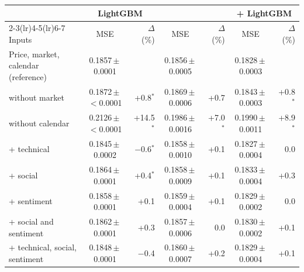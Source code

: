 \begin{tabular}{@{}lcrcrcr@{}}
\toprule
 & \multicolumn{2}{c}{LightGBM} & \multicolumn{2}{c}{\HQ{}} & \multicolumn{2}{c}{\HQ{} + LightGBM} \\
\cmidrule(lr){2-3}\cmidrule(lr){4-5}\cmidrule(lr){6-7}
Inputs & MSE & $\Delta$ (\%) & MSE & $\Delta$ (\%) & MSE & $\Delta$ (\%) \\
\midrule
Price, market, calendar (reference) & 0.1857\,$\pm$\,0.0001 &  & 0.1856\,$\pm$\,0.0005 &  & 0.1828\,$\pm$\,0.0003 &  \\
\addlinespace[2pt]
\quad without market & 0.1872\,$\pm$\,$<$0.0001 & +0.8$^{*}$ & 0.1869\,$\pm$\,0.0006 & +0.7 & 0.1843\,$\pm$\,0.0003 & +0.8$^{*}$ \\
\quad without calendar & 0.2126\,$\pm$\,$<$0.0001 & +14.5$^{*}$ & 0.1986\,$\pm$\,0.0016 & +7.0$^{*}$ & 0.1990\,$\pm$\,0.0011 & +8.9$^{*}$ \\
\quad + technical & 0.1845\,$\pm$\,0.0002 & $-$0.6$^{*}$ & 0.1858\,$\pm$\,0.0010 & +0.1 & 0.1827\,$\pm$\,0.0004 & 0.0 \\
\quad + social & 0.1864\,$\pm$\,0.0001 & +0.4$^{*}$ & 0.1858\,$\pm$\,0.0009 & +0.1 & 0.1833\,$\pm$\,0.0004 & +0.3 \\
\quad + sentiment & 0.1858\,$\pm$\,0.0001 & +0.1 & 0.1859\,$\pm$\,0.0004 & +0.1 & 0.1829\,$\pm$\,0.0002 & 0.0 \\
\quad + social and sentiment & 0.1862\,$\pm$\,0.0001 & +0.3 & 0.1857\,$\pm$\,0.0006 & 0.0 & 0.1830\,$\pm$\,0.0002 & +0.1 \\
\quad + technical, social, sentiment & 0.1848\,$\pm$\,0.0001 & $-$0.4 & 0.1860\,$\pm$\,0.0007 & +0.2 & 0.1829\,$\pm$\,0.0004 & +0.1 \\
\bottomrule
\end{tabular}
